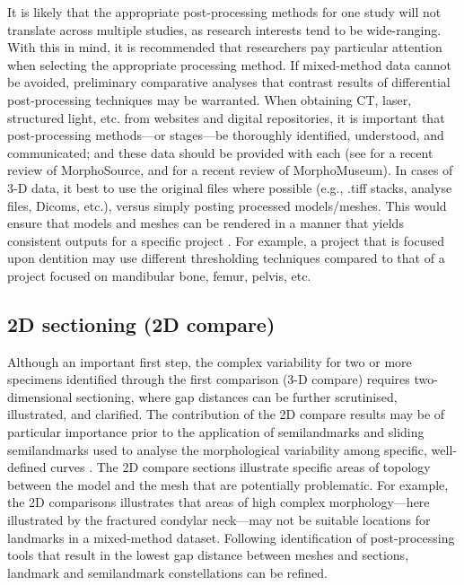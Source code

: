 \documentclass[review]{elsarticle}
\begin{document}
It is likely that the appropriate post-processing methods for one study will not translate across multiple studies, as research interests tend to be wide-ranging. With this in mind, it is recommended that researchers pay particular attention when selecting the appropriate processing method. If mixed-method data cannot be avoided, preliminary comparative analyses that contrast results of differential post-processing techniques may be warranted. When obtaining CT, laser, structured light, etc. from websites and digital repositories, it is important that post-processing methods---or stages---be thoroughly identified, understood, and communicated; and these data should be provided with each (see \cite{RN11502} for a recent review of MorphoSource, and \cite{RN11503} for a recent review of MorphoMuseum). In cases of 3-D data, it best to use the original files where possible (e.g., .tiff stacks, analyse files, Dicoms, etc.), versus simply posting processed models/meshes. This would ensure that models and meshes can be rendered in a manner that yields consistent outputs for a specific project \citep{RN8984}. For example, a project that is focused upon dentition may use different thresholding techniques compared to that of a project focused on mandibular bone, femur, pelvis, etc.

\subsection*{2D sectioning (2D compare)}

Although an important first step, the complex variability for two or more specimens identified through the first comparison (3-D compare) requires two-dimensional sectioning, where gap distances can be further scrutinised, illustrated, and clarified. The contribution of the 2D compare results may be of particular importance prior to the application of semilandmarks \citep{RN4772,RN1768} and sliding semilandmarks used to analyse the morphological variability among specific, well-defined curves \citep{RN5921,RN5920}. The 2D compare sections illustrate specific areas of topology between the model and the mesh that are potentially problematic. For example, the 2D comparisons illustrates that areas of high complex morphology---here illustrated by the fractured condylar neck---may not be suitable locations for landmarks in a mixed-method dataset. Following identification of post-processing tools that result in the lowest gap distance between meshes and sections, landmark and semilandmark constellations can be refined.
\end{document}
